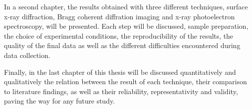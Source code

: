 In a second chapter, the results obtained with three different techniques, surface x-ray diffraction, Bragg coherent diffration imaging and x-ray photoelectron spectroscopy, will be presented.
Each step will be discussed, sample preparation, the choice of experimental conditions, the reproducibility of the results, the quality of the final data as well as the different difficulties encountered during data collection.

Finally, in the last chapter of this thesis will be discussed quantitatively and qualitatively the relation between the result of each technique, their comparison to literature findings, as well as their reliability, representativity and validity, paving the way for any future study.